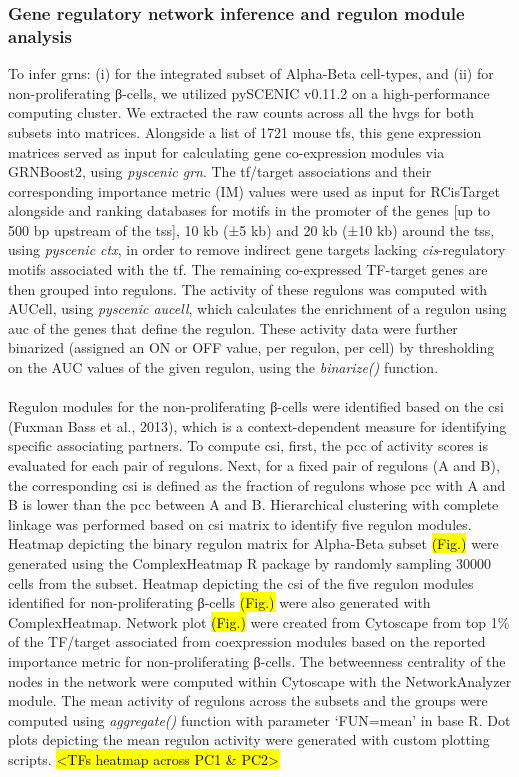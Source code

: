 \subsubsection{\large Gene regulatory network inference and regulon module analysis}
To infer \glspl{grn}: (i) for the integrated subset of Alpha-Beta cell-types, and (ii) for non-proliferating β-cells, we utilized pySCENIC v0.11.2 on a high-performance computing cluster. We extracted the raw counts across all the \glspl{hvg} for both subsets into matrices. Alongside a list of 1721 mouse \glspl{tf}, this gene expression matrices served as input for calculating gene co-expression modules via GRNBoost2, using \textit{pyscenic grn}. The \gls{tf}/target associations and their corresponding importance metric (IM) values were used as input for RCisTarget alongside and ranking databases for motifs in the promoter of the genes [up to 500 \gls{bp} upstream of the \gls{tss}], 10 kb (±5 kb) and 20 kb (±10 kb) around the \gls{tss}, using \textit{pyscenic ctx}, in order to remove indirect gene targets lacking \textit{cis}-regulatory motifs associated with the \gls{tf}. The remaining co-expressed TF-target genes are then grouped into regulons. The activity of these regulons was computed with AUCell, using \textit{pyscenic aucell}, which calculates the enrichment of a regulon using \gls{auc} of the genes that define the regulon. These activity data were further binarized (assigned an ON or OFF value, per regulon, per cell) by thresholding on the AUC values of the given regulon, using the \textit{binarize()} function.\\\\
Regulon modules for the non-proliferating β-cells were identified based on the \gls{csi} (Fuxman Bass et al., 2013), which is a context-dependent measure for identifying specific associating partners. To compute \gls{csi}, first, the \gls{pcc} of activity scores is evaluated for each pair of regulons. Next, for a fixed pair of regulons (A and B), the corresponding \gls{csi} is defined as the fraction of regulons whose \gls{pcc} with A and B is lower than the \gls{pcc} between A and B. Hierarchical clustering with complete linkage was performed based on \gls{csi} matrix to identify five regulon modules.\\


Heatmap depicting the binary regulon matrix for Alpha-Beta subset \hl{(Fig.)} were generated using the ComplexHeatmap R package by randomly sampling 30000 cells from the subset. Heatmap depicting the \gls{csi} of the five regulon modules identified for non-proliferating β-cells \hl{(Fig.)} were also generated with ComplexHeatmap.  Network plot \hl{(Fig.)} were created from Cytoscape from top 1\%  of the TF/target associated from coexpression modules based on the reported importance metric for non-proliferating β-cells. The betweenness centrality of the nodes in the network were computed within Cytoscape with the NetworkAnalyzer module. The mean activity of regulons across the subsets and the groups were computed using \textit{aggregate()} function with parameter `FUN=mean' in base R. Dot plots depicting the mean regulon activity were generated with custom plotting scripts.  \hl{<TFs heatmap across PC1 \& PC2>}


